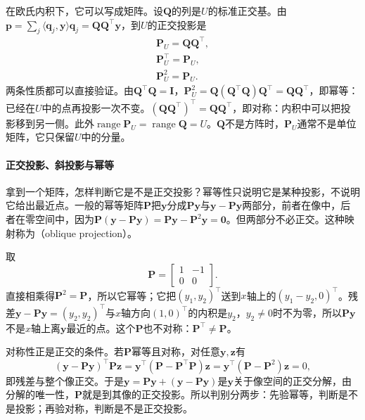 在欧氏内积下，它可以写成矩阵。设$\bm Q$的列是$U$的标准正交基。由$\bm p=\sum_j\langle\bm q_j,\bm y\rangle\bm q_j=\bm Q\bm Q^\top\bm y$，到$U$的正交投影是
\begin{equation}
\begin{gathered}
\bm P_U=\bm Q\bm Q^\top,\\
\bm P_U^\top=\bm P_U,\\
\bm P_U^2=\bm P_U.
\end{gathered}
\label{eq:linear-algebra-orthogonal-projector}
\end{equation}
两条性质都可以直接验证。由$\bm Q^\top\bm Q=\bm I$，$\bm P_U^2=\bm Q(\bm Q^\top\bm Q)\bm Q^\top=\bm Q\bm Q^\top$，即幂等：已经在$U$中的点再投影一次不变。$(\bm Q\bm Q^\top)^\top=\bm Q\bm Q^\top$，即对称：内积中可以把投影移到另一侧。此外$\operatorname{range}\bm P_U=\operatorname{range}\bm Q=U$。$\bm Q$不是方阵时，$\bm P_U$通常不是单位矩阵，它只保留$U$中的分量。

\paragraph{正交投影、斜投影与幂等}
拿到一个矩阵，怎样判断它是不是正交投影？幂等性只说明它是某种投影，不说明它给出最近点。一般的幂等矩阵$\bm P$把$\bm y$分成$\bm P\bm y$与$\bm y-\bm P\bm y$两部分，前者在像中，后者在零空间中，因为$\bm P(\bm y-\bm P\bm y)=\bm P\bm y-\bm P^2\bm y=\bm0$。但两部分不必正交。这种映射称为（oblique projection）。

\begin{example}[反例：幂等而不对称的投影]
\label{ex:ls-oblique-projection}
取
\[
 \bm P=\begin{bmatrix}1&-1\\0&0\end{bmatrix}.
\]
直接相乘得$\bm P^2=\bm P$，所以它幂等；它把$(y_1,y_2)^\top$送到$x$轴上的$(y_1-y_2,0)^\top$。残差$\bm y-\bm P\bm y=(y_2,y_2)^\top$与$x$轴方向$(1,0)^\top$的内积是$y_2$，$y_2\neq0$时不为零，所以$\bm P\bm y$不是$x$轴上离$\bm y$最近的点。这个$\bm P$也不对称：$\bm P^\top\neq\bm P$。
\end{example}

对称性正是正交的条件。若$\bm P$幂等且对称，对任意$\bm y,\bm z$有
\[
 (\bm y-\bm P\bm y)^\top\bm P\bm z=\bm y^\top(\bm P-\bm P^\top\bm P)\bm z=\bm y^\top(\bm P-\bm P^2)\bm z=0,
\]
即残差与整个像正交。于是$\bm y=\bm P\bm y+(\bm y-\bm P\bm y)$是$\bm y$关于像空间的正交分解，由分解的唯一性，$\bm P$就是到其像的正交投影。所以判别分两步：先验幂等，判断是不是投影；再验对称，判断是不是正交投影。

